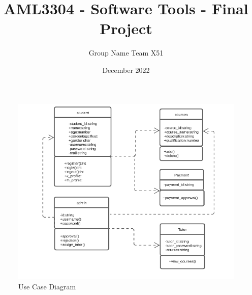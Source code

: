 \documentclass{article}
\title{AML3304 - Software Tools - Final Project}
\author{Group Name Team X51}
\date{December 2022}
\begin{document}
\maketitle









\begin{figure}[!hbt]
    \includegraphics{2.png}
    \caption{Use Case Diagram}
\end{figure}
\end{document}
